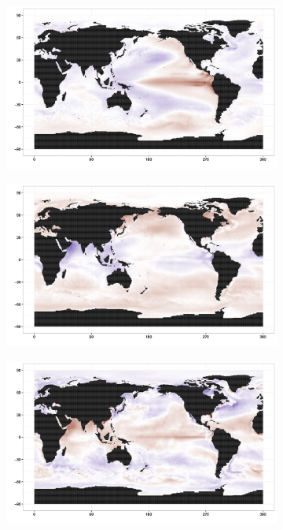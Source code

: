 \begin{figure}[h!bt]
\begin{subfigure}{.3\textwidth}
  \end{subfigure}
  \begin{subfigure}{.3\textwidth}
    \centering
    \includegraphics[width=.9\linewidth]{images/EOF3_55.png}
  \end{subfigure}
  \begin{subfigure}{.3\textwidth}
    \centering
    \includegraphics[width=.9\linewidth]{images/EOF6_55.png}
  \end{subfigure}
  \begin{subfigure}{.3\textwidth}
    \centering
    \includegraphics[width=.9\linewidth]{images/EOF7_55.png}

\end{subfigure}
\end{figure}
